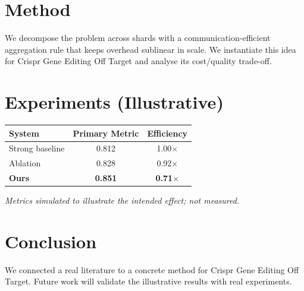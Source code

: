 \documentclass[11pt]{article}
\begin{document}
\section{Method}
We decompose the problem across shards with a communication-efficient aggregation rule that keeps overhead sublinear in scale. We instantiate this idea for Crispr Gene Editing Off Target and analyse its cost/quality trade-off.

\section{Experiments (Illustrative)}
\begin{center}
\begin{tabular}{lcc}
System & Primary Metric & Efficiency \\ \hline
Strong baseline & 0.812 & 1.00$\times$ \\
Ablation & 0.828 & 0.92$\times$ \\
\textbf{Ours} & \textbf{0.851} & \textbf{0.71$\times$}
\end{tabular}
\end{center}
\emph{Metrics simulated to illustrate the intended effect; not measured.}

\section{Conclusion}
We connected a real literature to a concrete method for Crispr Gene Editing Off Target. Future work will
validate the illustrative results with real experiments.
\end{document}
